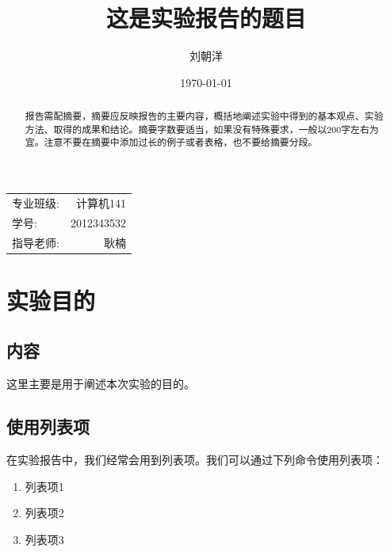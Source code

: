 \documentclass[hyperref,UTF8]{ctexart}
\title{这是实验报告的题目} %
\author{\kaishu 刘朝洋} %
\date{\today} %
\begin{document}
\maketitle %

\begin{center}
\begin{tabular}{l r}
专业班级: & 计算机141 \\ %
学号: & 2012343532 \\ %
指导老师: & 耿楠 %
\end{tabular}
\end{center}

\begin{abstract}
报告需配摘要，摘要应反映报告的主要内容，概括地阐述实验中得到的基本观点、实验方法、取得的成果和结论。摘要字数要适当，如果没有特殊要求，一般以200字左右为宜。注意不要在摘要中添加过长的例子或者表格，也不要给摘要分段。
\end{abstract}

\pagestyle{plain}

\section{实验目的}

\subsection{内容}

这里主要是用于阐述本次实验的目的。

\subsection{使用列表项}

在实验报告中，我们经常会用到列表项。我们可以通过下列命令使用列表项：

\begin{enumerate}

\item 列表项1
\item 列表项2
\item 列表项3

\end{enumerate}
 
\end{document}
